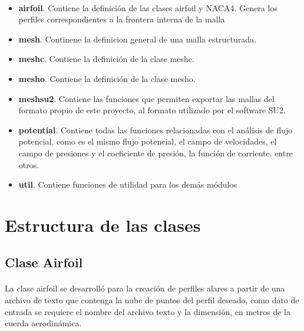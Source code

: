 \documentclass[letterpaper, openright, 12pt]{book}
\begin{document}
    \paragraph*{}
    \begin{itemize}
        \item \textbf{airfoil}. Contiene la definición de las clases airfoil y
            NACA4. Genera los perfiles correspondientes a la frontera interna
            de la malla
        \item \textbf{mesh}. Continene la definicion general de una malla estructurada.
        \item \textbf{mesh\textunderscore c}. Contiene la definición de la clase
            mesh\textunderscore c.
        \item \textbf{mesh\textunderscore o}. Contiene la definición de la clase
            mesh\textunderscore o.
        \item \textbf{mesh\textunderscore su2}. Contiene las funciones que
            permiten exportar las mallas del formato propio de este proyecto,
            al formato utilizado por el software SU2.
        \item \textbf{potential}. Contiene todas las funciones relacionadas con
            el análisis de flujo potencial, como es el mismo flujo
            potencial, el campo de velocidades, el campo de presiones y el
            coeficiente de presión, la función de corriente, entre otros.
        \item \textbf{util}. Contiene funciones de utilidad para los demás
            módulos
    \end{itemize}


    \section{Estructura de las clases}
    \subsection{Clase Airfoil}
    \paragraph*{}
    La clase airfoil se desarrolló para la creación de perfiles alares a partir
    de una archivo de texto que contenga la nube de puntos del perfil deseado,
    como dato de entrada se requiere el nombre del archivo texto y la
    dimensión, en metros de la cuerda aerodinámica.
\end{document}
